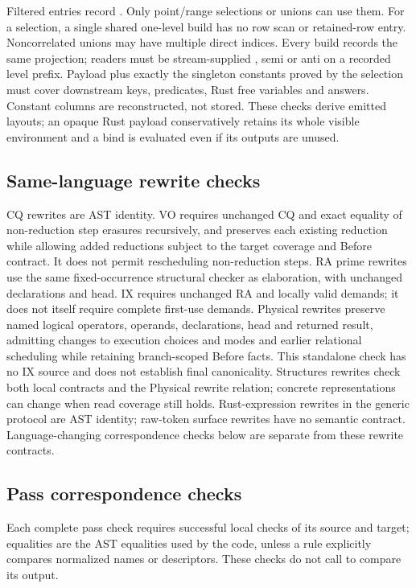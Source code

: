 Filtered entries record .
Only point/range selections or unions can use them. For a selection, a single
shared one-level build has no row scan or retained-row entry. Noncorrelated
unions may have multiple direct indices. Every build records the same
projection; readers must be stream-supplied , semi or anti
on a recorded level prefix. Payload plus exactly the singleton constants proved
by the selection must cover downstream keys, predicates, Rust free variables
and answers. Constant columns are reconstructed, not stored. These checks
derive emitted layouts; an opaque Rust payload conservatively retains its
whole visible environment and a bind is evaluated even if its outputs are unused.

\subsection{Same-language rewrite checks}
CQ rewrites are AST identity. VO requires unchanged CQ and exact equality
of non-reduction step erasures recursively, and preserves each existing
reduction while allowing added reductions subject to the target coverage
and Before contract. It does not permit rescheduling non-reduction steps. RA prime rewrites
use the same fixed-occurrence structural checker as elaboration, with unchanged
declarations and head. IX requires unchanged RA and locally valid demands;
it does not itself require complete first-use demands. Physical rewrites
preserve named logical operators, operands, declarations, head and returned
result, admitting changes to execution choices and modes and earlier
relational scheduling while retaining branch-scoped Before facts. This
standalone check has no IX source and does not establish final canonicality.
Structures rewrites check both local contracts and the Physical rewrite
relation; concrete representations can change when read coverage still holds.
Rust-expression rewrites in the generic protocol are AST identity; raw-token
surface rewrites have no semantic contract. Language-changing correspondence
checks below are separate from these rewrite contracts.

\subsection{Pass correspondence checks}
Each complete pass check requires successful local checks of its source
and target; equalities are the AST equalities used by the code, unless a rule
explicitly compares normalized names or descriptors. These checks do not call
 to compare its output.

